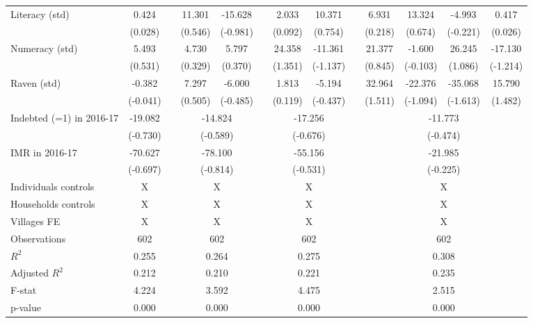 \begin{table}[htbp]
{\begin{tabular}{lcccccccccccc}
    Literacy (std) & 0.424 &       & 11.301 & -15.628 &       & 2.033 & 10.371 &       & 6.931 & 13.324 & -4.993 & 0.417 \\
          & (0.028) &       & (0.546) & (-0.981) &       & (0.092) & (0.754) &       & (0.218) & (0.674) & (-0.221) & (0.026) \\
    Numeracy (std) & 5.493 &       & 4.730 & 5.797 &       & 24.358 & -11.361 &       & 21.377 & -1.600 & 26.245 & -17.130 \\
          & (0.531) &       & (0.329) & (0.370) &       & (1.351) & (-1.137) &       & (0.845) & (-0.103) & (1.086) & (-1.214) \\
    Raven (std) & -0.382 &       & 7.297 & -6.000 &       & 1.813 & -5.194 &       & 32.964 & -22.376 & -35.068 & 15.790 \\
          & (-0.041) &       & (0.505) & (-0.485) &       & (0.119) & (-0.437) &       & (1.511) & (-1.094) & (-1.613) & (1.482) \\
\cmidrule{1-2}\cmidrule{4-5}\cmidrule{7-8}\cmidrule{10-13}    Indebted (=1) in 2016-17 & -19.082 &       & \multicolumn{2}{c}{-14.824} &       & \multicolumn{2}{c}{-17.256} &       & \multicolumn{4}{c}{-11.773} \\
          & (-0.730) &       & \multicolumn{2}{c}{(-0.589)} &       & \multicolumn{2}{c}{(-0.676)} &       & \multicolumn{4}{c}{(-0.474)} \\
    IMR in 2016-17 & -70.627 &       & \multicolumn{2}{c}{-78.100} &       & \multicolumn{2}{c}{-55.156} &       & \multicolumn{4}{c}{-21.985} \\
          & (-0.697) &       & \multicolumn{2}{c}{(-0.814)} &       & \multicolumn{2}{c}{(-0.531)} &       & \multicolumn{4}{c}{(-0.225)} \\
    Individuals controls & X     &       & \multicolumn{2}{c}{X} &       & \multicolumn{2}{c}{X} &       & \multicolumn{4}{c}{X} \\
    Households controls & X     &       & \multicolumn{2}{c}{X} &       & \multicolumn{2}{c}{X} &       & \multicolumn{4}{c}{X} \\
    Villages FE & X     &       & \multicolumn{2}{c}{X} &       & \multicolumn{2}{c}{X} &       & \multicolumn{4}{c}{X} \\
    \midrule
    Observations & 602   &       & \multicolumn{2}{c}{602} &       & \multicolumn{2}{c}{602} &       & \multicolumn{4}{c}{602} \\
    $R^2$ & 0.255 &       & \multicolumn{2}{c}{0.264} &       & \multicolumn{2}{c}{0.275} &       & \multicolumn{4}{c}{0.308} \\
    Adjusted $R^2$ & 0.212 &       & \multicolumn{2}{c}{0.210} &       & \multicolumn{2}{c}{0.221} &       & \multicolumn{4}{c}{0.235} \\
    F-stat & 4.224 &       & \multicolumn{2}{c}{3.592} &       & \multicolumn{2}{c}{4.475} &       & \multicolumn{4}{c}{2.515} \\
    p-value & 0.000 &       & \multicolumn{2}{c}{0.000} &       & \multicolumn{2}{c}{0.000} &       & \multicolumn{4}{c}{0.000} \\
    \bottomrule


\end{tabular}}
\end{table}
